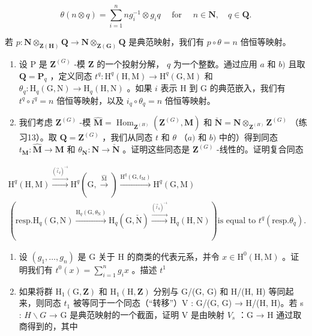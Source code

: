 \[
\theta (n \otimes q) = \sum_ {i = 1} ^ {n} n g _ {i} ^ {- 1} \otimes g _ {i} q \quad \text { for } \quad n \in \mathbf {N}, \quad q \in \mathbf {Q}.
\]

若 \(p: \mathbf{N} \otimes_{\mathbf{Z}(\mathbf{H})} \mathbf{Q} \to \mathbf{N} \otimes_{\mathbf{Z}(\mathbf{G})} \mathbf{Q}\) 是典范映射，我们有 \(p \circ \theta = n\) 倍恒等映射。
\begin{enumerate}
\def\labelenumi{\alph{enumi})}
\setcounter{enumi}{2}
\item
  设 P 是 \(\mathbf{Z}^{(G)}\) -模 \(\mathbf{Z}\) 的一个投射分解， \(q\) 为一个整数。通过应用 \(a\) 和 \(b)\) 且取 \(\mathbf{Q} = \mathbf{P}_q\) ，定义同态 \(t^q: \mathrm{H}^q(\mathrm{H}, \mathrm{M}) \to \mathrm{H}^q(\mathrm{G}, \mathrm{M})\) 和 \(\theta_q: \mathrm{H}_q(\mathrm{G}, \mathrm{N}) \to \mathrm{H}_q(\mathrm{H}, \mathrm{N})\) 。如果 \(i\) 表示 H 到 G 的典范嵌入，我们有 \(t^q \circ i^q = n\) 倍恒等映射，以及 \(i_q \circ \theta_q = n\) 倍恒等映射。
\item
  我们考虑 \(\mathbf{Z}^{(G)}\) -模 \(\hat{\mathbf{M}} = \operatorname{Hom}_{\mathbf{Z}^{(H)}} (\mathbf{Z}^{(G)}, \mathbf{M})\) 和 \(\check{\mathbf{N}} = \mathbf{N} \otimes_{\mathbf{Z}^{(H)}} \mathbf{Z}^{(G)}\) （练习13）。取 \(\mathbf{Q} = \mathbf{Z}^{(G)}\) ，我们从同态 \(t\) 和 \(\theta\) （\(a)\) 和 \(b)\) 中的）得到同态 \(t_\mathbf{M}: \hat{\mathbf{M}} \to \mathbf{M}\) 和 \(\theta_\mathbf{N}: \mathbf{N} \to \check{\mathbf{N}}\) 。证明这些同态是 \(\mathbf{Z}^{(G)}\) -线性的。证明复合同态
\end{enumerate}

\[
\begin{array}{c} \mathrm{H} ^ {q} (\mathrm{H}, \mathrm{M}) \xrightarrow {\stackrel {{(\vec {l} _ {q}) ^ {- 1}}} {{\longrightarrow}}} \mathrm{H} ^ {q} (\mathrm{G}, \stackrel {{\hat {\mathrm{M}}}} {{\longrightarrow}}) \xrightarrow {\mathrm{H} ^ {q} (\mathrm{G} , t _ {\mathrm{M}})} \mathrm{H} ^ {q} (\mathrm{G}, \mathrm{M}) \\ (\text {resp.} \mathrm{H} _ {q} (\mathrm{G}, \mathrm{N}) \xrightarrow {\mathrm{H} _ {q} (\mathrm{G} , \theta_ {\mathrm{N}})} \mathrm{H} _ {q} (\mathrm{G}, \check {\mathrm{N}}) \xrightarrow {\stackrel {{(\vec {l} _ {q}) ^ {- 1}}} {{\longrightarrow}}} \mathrm{H} _ {q} (\mathrm{H}, \mathrm{N})) \text {is equal to } t ^ {q} (\text {resp.} \theta_ {q}). \end{array}
\]

\begin{enumerate}
\def\labelenumi{\alph{enumi})}
\setcounter{enumi}{4}
\item
  设 \((g_{1},\ldots ,g_{n})\) 是 G 关于 H 的商类的代表元系，并令 \(x\in \mathrm{H}^0 (\mathrm{H},\mathrm{M})\) 。证明我们有 \(t^0 (x) = \sum_{i = 1}^{n}g_{i}x\) 。描述 \(t^1\)
\item
  如果将群 \(\mathrm{H}_{1}(\mathrm{G},\mathbf{Z})\) 和 \(\mathrm{H}_{1}(\mathrm{H},\mathbf{Z})\) 分别与 G/(G, G) 和 H/(H, H) 等同起来，则同态 \(t_{1}\) 被等同于一个同态（“转移”）V : G/(G, G) → H/(H, H)。若 s : \(H \backslash G\) → G 是典范映射的一个截面，证明 V 是由映射 \(V_{s}\) ：G → H 通过取商得到的，其中
\end{enumerate}

